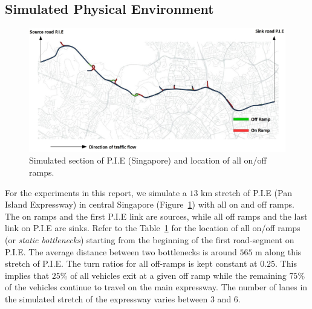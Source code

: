 \documentclass[12pt]{article}
\begin{document}
\subsection{Simulated Physical Environment}
\label{subsec:pie}
\begin{center}
\begin{figure}[!htbp]
    \centering
    \includegraphics[scale=0.40]{images/PIE.jpg}

    \caption{Simulated section of P.I.E (Singapore) and location of all on/off ramps.}
    \label{fig:pie-changi}
  \end{figure}
\end{center}
For the experiments in this report, we simulate a $13$ km stretch of P.I.E (Pan Island Expressway) in central Singapore (Figure~\ref{fig:pie-changi}) with all on and off ramps. The on ramps and the first P.I.E link are sources, while all off ramps and the last link on P.I.E are sinks. Refer to the Table~\ref{fig:pie-changi} for the location of all on/off ramps (or {\it static bottlenecks}) starting from the beginning of the first road-segment on P.I.E. The average distance between two bottlenecks is around $565\text{~m}$ along this stretch of P.I.E. The turn ratios for all off-ramps is kept constant at $0.25$. This implies that $25\%$ of all vehicles exit at a given off ramp while the remaining $75\%$ of the vehicles continue to travel on the main expressway. The number of lanes in the simulated stretch of the expressway varies between $3$ and $6$.
\end{document}
